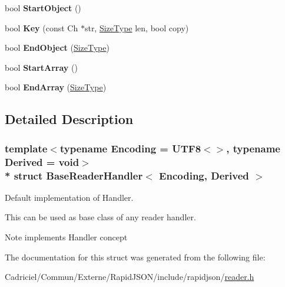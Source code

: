 \begin{DoxyCompactItemize}
\item 
bool {\bfseries Start\+Object} ()\hypertarget{struct_base_reader_handler_ab0a7d9bcececb8d6ed748656f67f4917}{}\label{struct_base_reader_handler_ab0a7d9bcececb8d6ed748656f67f4917}

\item 
bool {\bfseries Key} (const Ch $\ast$str, \hyperlink{rapidjson_8h_a5ed6e6e67250fadbd041127e6386dcb5}{Size\+Type} len, bool copy)\hypertarget{struct_base_reader_handler_abc50b2e7e411b7b731715e05cd01e2eb}{}\label{struct_base_reader_handler_abc50b2e7e411b7b731715e05cd01e2eb}

\item 
bool {\bfseries End\+Object} (\hyperlink{rapidjson_8h_a5ed6e6e67250fadbd041127e6386dcb5}{Size\+Type})\hypertarget{struct_base_reader_handler_a0406cee0af26bc3a0b7fb2414537b0ab}{}\label{struct_base_reader_handler_a0406cee0af26bc3a0b7fb2414537b0ab}

\item 
bool {\bfseries Start\+Array} ()\hypertarget{struct_base_reader_handler_a9dbb1143a250a904bb18a174553a3a00}{}\label{struct_base_reader_handler_a9dbb1143a250a904bb18a174553a3a00}

\item 
bool {\bfseries End\+Array} (\hyperlink{rapidjson_8h_a5ed6e6e67250fadbd041127e6386dcb5}{Size\+Type})\hypertarget{struct_base_reader_handler_ae9d60a8779b6a77a7f283d64961879fb}{}\label{struct_base_reader_handler_ae9d60a8779b6a77a7f283d64961879fb}

\end{DoxyCompactItemize}


\subsection{Detailed Description}
\subsubsection*{template$<$typename Encoding = U\+T\+F8$<$$>$, typename Derived = void$>$\\*
struct Base\+Reader\+Handler$<$ Encoding, Derived $>$}

Default implementation of Handler. 

This can be used as base class of any reader handler. \begin{DoxyNote}{Note}
implements Handler concept 
\end{DoxyNote}


The documentation for this struct was generated from the following file\+:\begin{DoxyCompactItemize}
\item 
Cadriciel/\+Commun/\+Externe/\+Rapid\+J\+S\+O\+N/include/rapidjson/\hyperlink{reader_8h}{reader.\+h}\end{DoxyCompactItemize}
